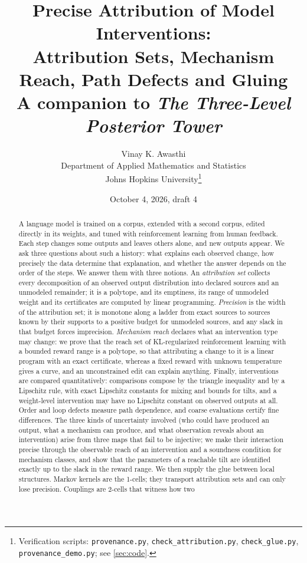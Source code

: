 \documentclass[11pt]{article}
\title{Precise Attribution of Model Interventions:\\
Attribution Sets, Mechanism Reach, Path Defects and Gluing\\[4pt]
\large A companion to \emph{The Three-Level Posterior Tower}}
\author{Vinay K. Awasthi\\
Department of Applied Mathematics and Statistics\\
Johns Hopkins University\thanks{Verification scripts: \texttt{provenance.py},
\texttt{check\_attribution.py}, \texttt{check\_glue.py}, \texttt{provenance\_demo.py}; see \cref{sec:code}.}}
\date{October 4, 2026, draft 4}
\theoremstyle{definition}
\theoremstyle{remark}
\begin{document}
\maketitle

\begin{abstract}
A language model is trained on a corpus, extended with a second corpus, edited directly in its
weights, and tuned with reinforcement learning from human feedback. Each step changes some outputs
and leaves others alone, and new outputs appear. We ask three questions about such a history: what
explains each observed change, how precisely the data determine that explanation, and whether the
answer depends on the order of the steps. We answer them with three notions. An \emph{attribution
set} collects every decomposition of an observed output distribution into declared sources and an
unmodeled remainder; it is a polytope, and its emptiness, its range of unmodeled weight and its
certificates are computed by linear programming. \emph{Precision} is the width of the attribution
set; it is monotone along a ladder from exact sources to sources known by their supports to a
positive budget for unmodeled sources, and any slack in that budget forces imprecision.
\emph{Mechanism reach} declares what an intervention type may change: we prove that the reach set of
KL-regularized reinforcement learning with a bounded reward range is a polytope, so that attributing
a change to it is a linear program with an exact certificate, whereas a fixed reward with unknown
temperature gives a curve, and an unconstrained edit can explain anything. Finally, interventions are
compared quantitatively: comparisons compose by the triangle inequality and by a Lipschitz rule, with
exact Lipschitz constants for mixing and bounds for tilts, and a weight-level intervention may have no
Lipschitz constant on observed outputs at all. Order and loop defects measure path dependence, and
coarse evaluations certify fine differences. The three kinds of uncertainty involved (who could
have produced an output, what a mechanism can produce, and what observation reveals about an
intervention) arise from three maps that fail to be injective; we make their interaction precise
through the observable reach of an intervention and a soundness condition for mechanism classes, and
show that the parameters of a reachable tilt are identified exactly up to the slack in the reward
range. We then supply the glue between local structures. Markov kernels are the 1-cells; they
transport attribution sets and can only lose precision. Couplings are 2-cells that witness how two

\end{abstract}
\end{document}
